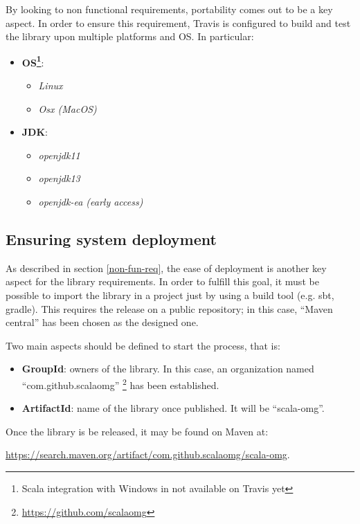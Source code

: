 By looking to non functional requirements, portability comes out to be a key aspect. In order to ensure this requirement, Travis is configured to build and test the library upon multiple platforms and OS. In particular:
\begin{itemize}
\item \textbf{OS\footnote{Scala integration with Windows in not available on Travis yet}}: 
  \begin{itemize}
  \item \textit{Linux}
  \item \textit{Osx (MacOS)}
  \end{itemize}
\item \textbf{JDK}:
  \begin{itemize}
  \item \textit{openjdk11}
  \item \textit{openjdk13}
  \item \textit{openjdk-ea (early access)}
  \end{itemize} 
\end{itemize}  

\subsection{Ensuring system deployment}

As described in section \ref{non-fun-req}, the ease of deployment is another key aspect for the library requirements. In order to fulfill this goal, it must be possible to import the library in a project just by using a build tool (e.g. sbt, gradle). This requires the release on a public repository; in this case, ``Maven central'' has been chosen as the designed one.

Two main aspects should be defined to start the process, that is:
\begin{itemize}
  \item \textbf{GroupId}: owners of the library. In this case, an organization named ``com.github.scalaomg'' \footnote{ \url{https://github.com/scalaomg}} has been established.
  \item \textbf{ArtifactId}: name of the library once published. It will be ``scala-omg''.
\end{itemize}

Once the library is be released, it may be found on Maven at: 

\begin{center}
\url{https://search.maven.org/artifact/com.github.scalaomg/scala-omg}.
\end{center}

